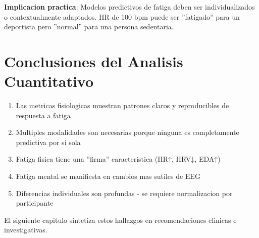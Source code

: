 \textbf{Implicacion practica}: Modelos predictivos de fatiga deben ser individualizados o contextualmente adaptados.
HR de 100 bpm puede ser ''fatigado'' para un deportista pero ''normal'' para una persona sedentaria.

\section{Conclusiones del Analisis Cuantitativo}

\begin{enumerate}
    \item Las metricas fisiologicas muestran patrones claros y reproducibles de respuesta a fatiga
    \item Multiples modalidades son necesarias porque ninguna es completamente predictiva por si sola
    \item Fatiga fisica tiene una ''firma'' caracteristica (HR↑, HRV↓, EDA↑)
    \item Fatiga mental se manifiesta en cambios mas sutiles de EEG
    \item Diferencias individuales son profundas - se requiere normalizacion por participante
\end{enumerate}

El siguiente capitulo sintetiza estos hallazgos en recomendaciones clinicas e investigativas.
